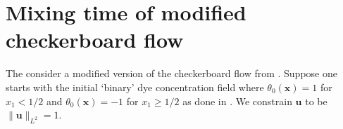 \documentclass{jfm}
\newcommand{\ltwo}[1]{\|#1\|_{L^{2}}}
\renewcommand{\vec}[1]{\mathbf{#1}}
\begin{document}
\appendix
\section{Mixing time of modified checkerboard flow}
\label{appendix:checkerboard}
The  consider a modified version of the checkerboard flow from \cite{JMP2012}. Suppose one starts with the initial `binary' dye concentration field where $\theta_{0}(\vec{x}) = 1$ for $x_{1}< 1/2$ and $\theta_{0}(\vec{x}) = -1$ for $x_{1}\geq 1/2$ as done in  \cite{JMP2012}. We constrain $\vec{u}$ to be  $\ltwo{\vec{u}} = 1$. 






\end{document}
